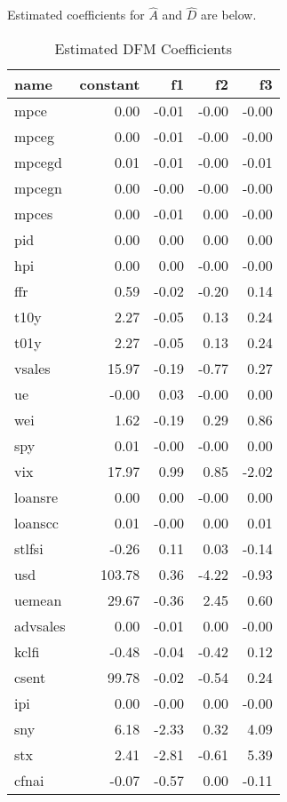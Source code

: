 \documentclass[11pt, letterpaper]{article}\usepackage[]{graphicx}\usepackage[]{color}
\begin{document}
Estimated coefficients for $\widehat{A}$ and $\widehat{D}$ are below.
\begin{table}[H]
\centering
\begingroup\footnotesize
\begin{tabular}{lrrrr}
  \hline
name & constant & f1 & f2 & f3 \\ 
  \hline
mpce & 0.00 & -0.01 & -0.00 & -0.00 \\ 
  mpceg & 0.00 & -0.01 & -0.00 & -0.00 \\ 
  mpcegd & 0.01 & -0.01 & -0.00 & -0.01 \\ 
  mpcegn & 0.00 & -0.00 & -0.00 & -0.00 \\ 
  mpces & 0.00 & -0.01 & 0.00 & -0.00 \\ 
  pid & 0.00 & 0.00 & 0.00 & 0.00 \\ 
  hpi & 0.00 & 0.00 & -0.00 & -0.00 \\ 
  ffr & 0.59 & -0.02 & -0.20 & 0.14 \\ 
  t10y & 2.27 & -0.05 & 0.13 & 0.24 \\ 
  t01y & 2.27 & -0.05 & 0.13 & 0.24 \\ 
  vsales & 15.97 & -0.19 & -0.77 & 0.27 \\ 
  ue & -0.00 & 0.03 & -0.00 & 0.00 \\ 
  wei & 1.62 & -0.19 & 0.29 & 0.86 \\ 
  spy & 0.01 & -0.00 & -0.00 & 0.00 \\ 
  vix & 17.97 & 0.99 & 0.85 & -2.02 \\ 
  loansre & 0.00 & 0.00 & -0.00 & 0.00 \\ 
  loanscc & 0.01 & -0.00 & 0.00 & 0.01 \\ 
  stlfsi & -0.26 & 0.11 & 0.03 & -0.14 \\ 
  usd & 103.78 & 0.36 & -4.22 & -0.93 \\ 
  uemean & 29.67 & -0.36 & 2.45 & 0.60 \\ 
  advsales & 0.00 & -0.01 & 0.00 & -0.00 \\ 
  kclfi & -0.48 & -0.04 & -0.42 & 0.12 \\ 
  csent & 99.78 & -0.02 & -0.54 & 0.24 \\ 
  ipi & 0.00 & -0.00 & 0.00 & -0.00 \\ 
  sny & 6.18 & -2.33 & 0.32 & 4.09 \\ 
  stx & 2.41 & -2.81 & -0.61 & 5.39 \\ 
  cfnai & -0.07 & -0.57 & 0.00 & -0.11 \\ 
   \hline
\end{tabular}
\endgroup
\caption{Estimated DFM Coefficients} 
\end{table}
\end{document}

